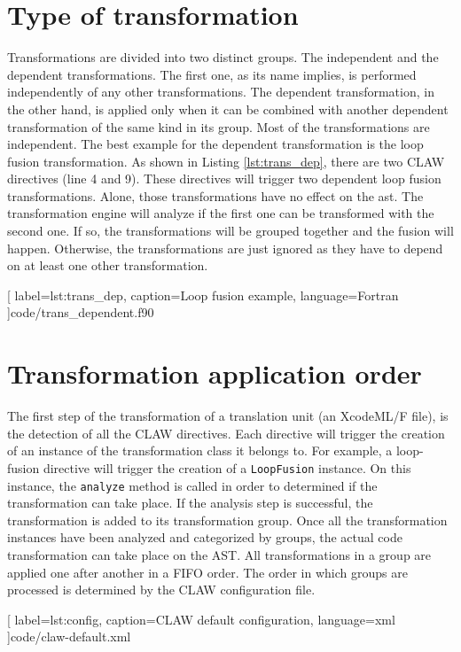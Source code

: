 \documentclass[a4paper, 11pt]{report}
\begin{document}
\section{Type of transformation}
Transformations are divided into two distinct groups. The independent and the
dependent transformations. The first one, as its name implies, is performed
independently of any other transformations. The dependent transformation, in the
other hand, is applied only when it can be combined with another dependent
transformation of the same kind in its group. Most of the transformations are
independent. The best example for the dependent transformation is the loop
fusion transformation. As shown in Listing \ref{lst:trans_dep}, there are two
CLAW directives (line 4 and 9). These directives will trigger two dependent loop
fusion transformations. Alone, those transformations have no effect
on the \gls{ast}. The transformation engine will analyze if the
first one can be transformed with the second one. If so, the transformations will
be grouped together and the fusion will happen. Otherwise, the transformations
are just ignored as they have to depend on at least one other transformation.


  [
    label=lst:trans_dep,
    caption=Loop fusion example,
    language=Fortran
  ]{code/trans_dependent.f90}

\section{Transformation application order}
The first step of the transformation of a translation unit (an XcodeML/F file),
is the detection of all the CLAW directives. Each directive will trigger the
creation of an instance of the transformation class it belongs to. For example,
a loop-fusion directive will trigger the creation of a \lstinline|LoopFusion|
instance. On this instance, the \lstinline|analyze| method is called in order
to determined if the transformation can take place. If the analysis step is
successful, the transformation is added to its transformation group.
Once all the transformation instances have been analyzed and categorized by
groups, the actual code transformation can take place on the AST. All
transformations in a group are applied one after another in a FIFO order.
The order in which groups are processed is determined by the CLAW configuration
file.


  [
    label=lst:config,
    caption=CLAW default configuration,
    language=xml
  ]{code/claw-default.xml}
\end{document}
